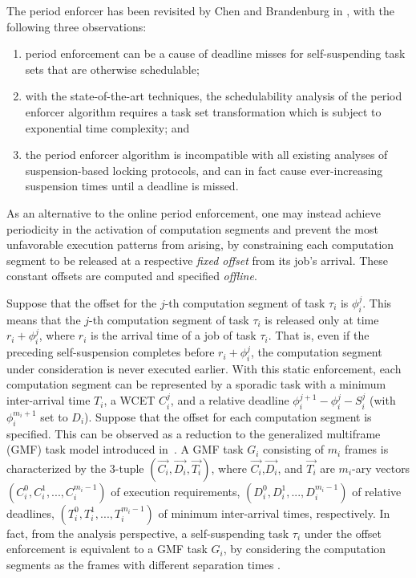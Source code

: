 The period enforcer has been revisited by Chen and Brandenburg in \cite{ChenBrandenburg}, with the following three observations:
\begin{enumerate}
	\item period enforcement can be a cause of deadline misses for self-suspending task sets that are otherwise schedulable;
	\item with the state-of-the-art techniques, the schedulability analysis of the period enforcer algorithm requires a task set 
	transformation which is subject to exponential time complexity; and 	
    \item the period enforcer algorithm is incompatible with all existing analyses of suspension-based locking protocols, 
	and can in fact cause ever-increasing suspension times until a deadline is missed.
\end{enumerate}

\label{sec:static-period-enforce}

As an alternative to the online period enforcement, one may instead achieve periodicity in the activation
of computation segments and prevent the most unfavorable execution patterns from arising, by constraining
each computation segment to be released at a respective \emph{fixed offset} from its job's arrival.
These constant offsets are computed and specified \emph{offline}.
 
Suppose that the offset for the $j$-th computation  segment of task $\tau_i$ is $\phi_i^j$. This means that the 
$j$-th computation segment of task $\tau_i$ is released only at time $r_i+\phi_i^j$, where $r_i$ is the arrival time of a job 
of task $\tau_i$. That is, even if the preceding self-suspension completes before $r_i+\phi_i^j$, the computation segment under 
consideration is never executed earlier. With this static enforcement, each computation segment can be represented by a sporadic 
task with a minimum inter-arrival time $T_i$, a WCET $C_i^j$, and a relative deadline $\phi_{i}^{j+1}-\phi_i^j-S_i^j$ (with 
$\phi_{i}^{m_i+1}$ set to $D_i$).
Suppose that the offset for each computation segment is specified. This can be observed as a reduction to 
the generalized multiframe (GMF) task model introduced in~\cite{baruah1999generalized}. A GMF task $G_i$ consisting of $m_i$ frames is characterized by the $3$-tuple $(\vec{C_i},\vec{D_i},\vec{T_i})$, where $\vec{C_i}$,$\vec{D_i}$, and $\vec{T_i}$ are $m_i$-ary vectors $(C_{i}^0,C_{i}^1,...,C_{i}^{m_i-1})$ of execution requirements, $(D_{i}^0,D_{i}^1,...,D_{i}^{m_i-1})$ of relative deadlines, $(T_{i}^0,T_{i}^1,...,T_{i}^{m_i-1})$ of minimum inter-arrival times, respectively.
In fact, from the analysis perspective, a self-suspending task $\tau_i$ under the offset enforcement is equivalent to a GMF task $G_i$,  by considering the computation segments as the frames with different separation times \cite{WC16-suspend-DATE,DBLP:journals/ieicet/DingTT09}.

